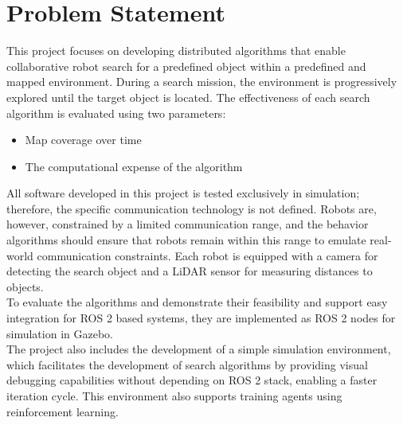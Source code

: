 \section{Problem Statement}
\label{sec:problem-statement}

This project focuses on developing distributed algorithms that enable collaborative robot search for a predefined object within a predefined and mapped environment. During a search mission, the environment is progressively explored until the target object is located. The effectiveness of each search algorithm is evaluated using two parameters:

\begin{itemize}
    \item Map coverage over time
    \item The computational expense of the algorithm
\end{itemize}

All software developed in this project is tested exclusively in simulation; therefore, the specific communication technology is not defined. Robots are, however, constrained by a limited communication range, and the behavior algorithms should ensure that robots remain within this range to emulate real-world communication constraints. Each robot is equipped with a camera for detecting the search object and a LiDAR sensor for measuring distances to objects. \\

To evaluate the algorithms and demonstrate their feasibility and support easy integration for ROS 2 based systems, they are implemented as ROS 2 nodes for simulation in Gazebo. \\

The project also includes the development of a simple simulation environment, which facilitates the development of search algorithms by providing visual debugging capabilities without depending on ROS 2 stack, enabling a faster iteration cycle. This environment also supports training agents using reinforcement learning.

